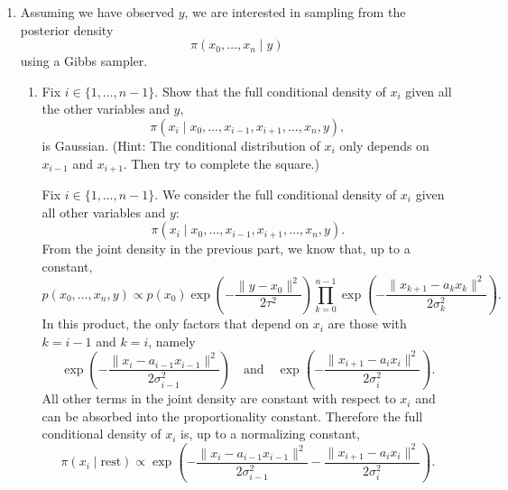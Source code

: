\documentclass[answers,12pt,addpoints]{exam}
\begin{document}
\begin{enumerate}
\begin{solution}
By the chain rule for densities, the joint density of $(x_0,\ldots,x_n,y)$ can be written as
\[
p(x_0,\ldots,x_n,y)
= p(x_0)\,\prod_{i=0}^{n-1} p(x_{i+1} \mid x_i)\,p(y \mid x_0).
\]
Each conditional distribution is Gaussian with density
\[
p(x_{i+1} \mid x_i)
= \frac{1}{(2\pi\sigma_i^2)^{d/2}}
\exp\!\left(
    -\frac{\|x_{i+1} - a_i x_i\|^2}{2\sigma_i^2}
\right),
\]
and
\[
p(y \mid x_0)
= \frac{1}{(2\pi\tau^2)^{d/2}}
\exp\!\left(
    -\frac{\|y - x_0\|^2}{2\tau^2}
\right).
\]
Therefore,
\[
p(x_0,\ldots,x_n,y)
= p(x_0)\,
\left[
    \prod_{i=0}^{n-1}
    \frac{1}{(2\pi\sigma_i^2)^{d/2}}
\right]
\frac{1}{(2\pi\tau^2)^{d/2}}
\exp\!\left(
    -\frac{\|y - x_0\|^2}{2\tau^2}
    - \sum_{i=0}^{n-1} \frac{\|x_{i+1} - a_i x_i\|^2}{2\sigma_i^2}
\right).
\]
All multiplicative constants in front of the exponential can be absorbed into a single proportionality
constant. Hence, up to a constant factor,
\[
p(x_0,\ldots,x_n,y)
\propto
p(x_0)
\exp\!\left(
    -\frac{\|y - x_0\|^2}{2\tau^2}
\right)
\prod_{i=0}^{n-1}
\exp\!\left(
    -\frac{\|x_{i+1} - a_i x_i\|^2}{2\sigma_i^2}
\right),
\]
which is the desired expression.
    \end{solution}
    \item Assuming we have observed $y$, we are interested in sampling from the posterior density
    \[
    \pi(x_0, \ldots, x_n \mid y)
    \]
    using a Gibbs sampler.
    \begin{enumerate}
        \item Fix $i \in \{1, \ldots, n-1\}$. Show that the full conditional density of $x_i$ given all the other variables and $y$,
        \[
        \pi(x_i \mid x_0, \ldots, x_{i-1}, x_{i+1}, \ldots, x_n, y),
        \]
        is Gaussian. (Hint: The conditional distribution of $x_i$ only depends on $x_{i-1}$ and $x_{i+1}$. Then try to complete the square.)
        \begin{solution}
            Fix $i \in \{1,\dots,n-1\}$. We consider the full conditional density of $x_i$
given all other variables and $y$:
\[
\pi(x_i \mid x_0,\dots,x_{i-1},x_{i+1},\dots,x_n,y).
\]
From the joint density in the previous part, we know that, up to a constant,
\[
p(x_0,\dots,x_n,y)
\propto
p(x_0)
\exp\!\left(
    -\frac{\|y - x_0\|^2}{2\tau^2}
\right)
\prod_{k=0}^{n-1}
\exp\!\left(
    -\frac{\|x_{k+1} - a_k x_k\|^2}{2\sigma_k^2}
\right).
\]
In this product, the only factors that depend on $x_i$ are those with $k=i-1$
and $k=i$, namely
\[
\exp\!\left(
    -\frac{\|x_i - a_{i-1} x_{i-1}\|^2}{2\sigma_{i-1}^2}
\right)
\quad\text{and}\quad
\exp\!\left(
    -\frac{\|x_{i+1} - a_i x_i\|^2}{2\sigma_i^2}
\right).
\]
All other terms in the joint density are constant with respect to $x_i$ and can
be absorbed into the proportionality constant. Therefore the full conditional
density of $x_i$ is, up to a normalizing constant,
\[
\pi(x_i \mid \text{rest})
\propto
\exp\!\left(
    -\frac{\|x_i - a_{i-1} x_{i-1}\|^2}{2\sigma_{i-1}^2}
    -\frac{\|x_{i+1} - a_i x_i\|^2}{2\sigma_i^2}
\right).
\]


\end{solution}
\end{enumerate}
\end{enumerate}
\end{document}
